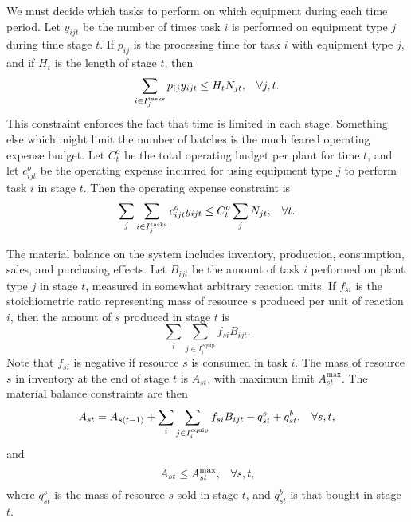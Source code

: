 We must decide which tasks to perform on which equipment during each time period.  Let $y_{ijt}$ be the number of times task $i$ is performed on equipment type $j$ during time stage $t$.  If $p_{ij}$ is the processing time for task $i$ with equipment type $j$, and if $H_t$ is the length of stage $t$, then
\begin{equation*}
\sum_{i\in I_j^{\text{tasks}}} p_{ij} y_{ijt} \leq H_t N_{jt}, \hspace{3mm} \forall j,t.
\end{equation*}
This constraint enforces the fact that time is limited in each stage.  Something else which might limit the number of batches is the much feared operating expense budget.  Let $C^o_t$ be the total operating budget per plant for time $t$, and let $c^o_{ijt}$ be the operating expense incurred for using equipment type $j$ to perform task $i$ in stage $t$.  Then the operating expense constraint is
\begin{equation*}
\sum_j \sum_{i\in I_j^{\text{tasks}}} c^o_{ijt} y_{ijt}\leq C^o_t \sum_j N_{jt}, \hspace{3mm} \forall t.
\end{equation*}

The material balance on the system includes inventory, production, consumption, sales, and purchasing effects.  Let $B_{ijt}$ be the amount of task $i$ performed on plant type $j$ in stage $t$, measured in somewhat arbitrary reaction units.  If $f_{si}$ is the stoichiometric ratio representing mass of resource $s$ produced per unit of reaction $i$, then the amount of $s$ produced in stage $t$ is
\[
\sum_i \sum_{j\in I_i^{\text{equip}}} f_{si}B_{ijt}.
\]
Note that $f_{si}$ is negative if resource $s$ is consumed in task $i$.  The mass of resource $s$ in inventory at the end of stage $t$ is $A_{st}$, with maximum limit $A_{st}^{\text{max}}$.  The material balance constraints are then
\begin{equation*}
A_{st} = A_{s(t-1)} + \sum_i \sum_{j\in I_i^{\text{equip}}} f_{si}B_{ijt} - q^s_{st} + q^b_{st}, \hspace{3mm} \forall s,t,
\end{equation*}
and
\begin{equation*}
A_{st} \leq A_{st}^{\text{max}}, \hspace{3mm} \forall s,t,
\end{equation*}
where $q^s_{st}$ is the mass of resource $s$ sold in stage $t$, and $q^b_{st}$ is that bought in stage $t$.

